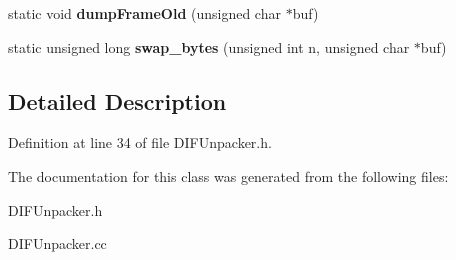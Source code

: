 \begin{DoxyCompactItemize}
\item 
static void {\bfseries dump\-Frame\-Old} (unsigned char $\ast$buf)\label{classDIFUnpacker_a24d530b0a8f9c525b9e1f569fd7e800f}

\item 
static unsigned long {\bfseries swap\-\_\-bytes} (unsigned int n, unsigned char $\ast$buf)\label{classDIFUnpacker_ab0b206c3dde528aca2b5d098b6314952}

\end{DoxyCompactItemize}


\subsection{Detailed Description}


Definition at line 34 of file D\-I\-F\-Unpacker.\-h.



The documentation for this class was generated from the following files\-:\begin{DoxyCompactItemize}
\item 
D\-I\-F\-Unpacker.\-h\item 
D\-I\-F\-Unpacker.\-cc\end{DoxyCompactItemize}
